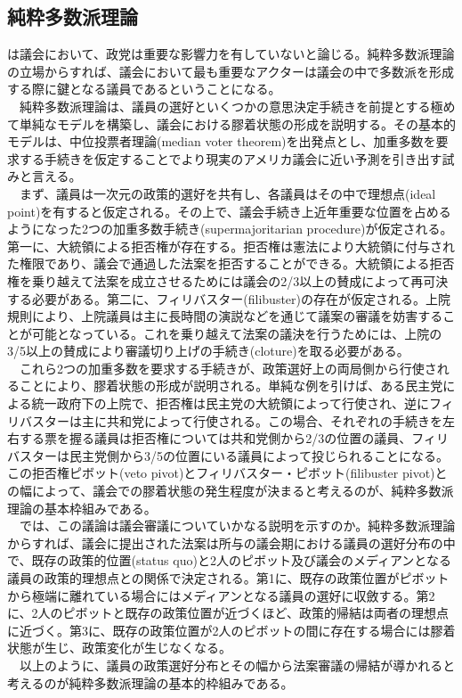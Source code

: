 \documentclass{article}
\begin{document}
\subsection{純粋多数派理論}
\citet*{Krehbiel1998-ob,Krehbiel2010-ob}は議会において、政党は重要な影響力を有していないと論じる。純粋多数派理論の立場からすれば、議会において最も重要なアクターは議会の中で多数派を形成する際に鍵となる議員であるということになる。\\
　純粋多数派理論は、議員の選好といくつかの意思決定手続きを前提とする極めて単純なモデルを構築し、議会における膠着状態の形成を説明する。その基本的モデルは、中位投票者理論(median voter theorem)を出発点とし、加重多数を要求する手続きを仮定することでより現実のアメリカ議会に近い予測を引き出す試みと言える。\\
　まず、議員は一次元の政策的選好を共有し、各議員はその中で理想点(ideal point)を有すると仮定される。その上で、議会手続き上近年重要な位置を占めるようになった2つの加重多数手続き(supermajoritarian procedure)が仮定される。第一に、大統領による拒否権が存在する。拒否権は憲法により大統領に付与された権限であり、議会で通過した法案を拒否することができる。大統領による拒否権を乗り越えて法案を成立させるためには議会の2/3以上の賛成によって再可決する必要がある。第二に、フィリバスター(filibuster)の存在が仮定される。上院規則により、上院議員は主に長時間の演説などを通じて議案の審議を妨害することが可能となっている。これを乗り越えて法案の議決を行うためには、上院の3/5以上の賛成により審議切り上げの手続き(cloture)を取る必要がある。\\
　これら2つの加重多数を要求する手続きが、政策選好上の両局側から行使されることにより、膠着状態の形成が説明される。単純な例を引けば、ある民主党による統一政府下の上院で、拒否権は民主党の大統領によって行使され、逆にフィリバスターは主に共和党によって行使される。この場合、それぞれの手続きを左右する票を握る議員は拒否権については共和党側から2/3の位置の議員、フィリバスターは民主党側から3/5の位置にいる議員によって投じられることになる。この拒否権ピボット(veto pivot)とフィリバスター・ピボット(filibuster pivot)との幅によって、議会での膠着状態の発生程度が決まると考えるのが、純粋多数派理論の基本枠組みである。\\
　では、この議論は議会審議についていかなる説明を示すのか。純粋多数派理論からすれば、議会に提出された法案は所与の議会期における議員の選好分布の中で、既存の政策的位置(status quo)と2人のピボット及び議会のメディアンとなる議員の政策的理想点との関係で決定される。第1に、既存の政策位置がピボットから極端に離れている場合にはメディアンとなる議員の選好に収斂する。第2に、2人のピボットと既存の政策位置が近づくほど、政策的帰結は両者の理想点に近づく。第3に、既存の政策位置が2人のピボットの間に存在する場合には膠着状態が生じ、政策変化が生じなくなる。\\
　以上のように、議員の政策選好分布とその幅から法案審議の帰結が導かれると考えるのが純粋多数派理論の基本的枠組みである。\\
\end{document}
